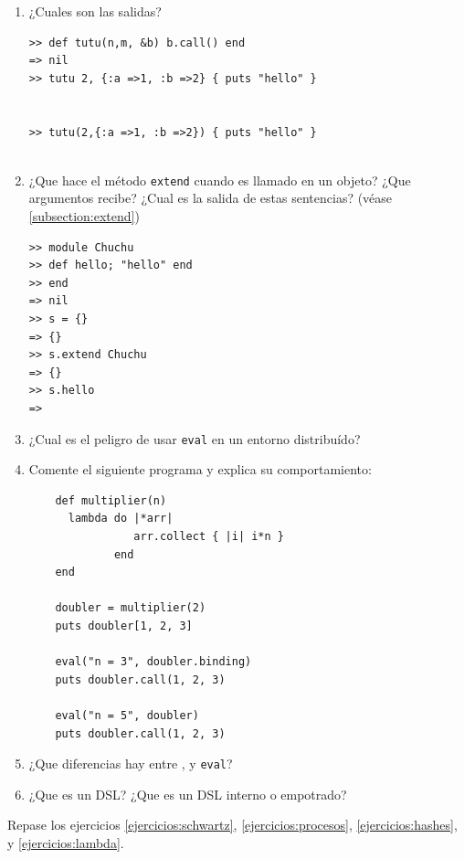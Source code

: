 \begin{enumerate}
\begin{verbatim}
   def initialize( block )
     @block = block
     @block.sub!(/^/,'lambda ') unless @block =~/^\s*(?:lambda|proc)/
     @func = eval "#{@block}"
   end


   def call(* args)
     __________(* args)
   end

   def arity
     @func.arity
   end

   def _____(limit)
     ______
   end

   def ____._____(s)
     ________(s)
   end
end
\end{verbatim}
\item ¿Cuales son las salidas?
\begin{verbatim}
>> def tutu(n,m, &b) b.call() end
=> nil
>> tutu 2, {:a =>1, :b =>2} { puts "hello" }


>> tutu(2,{:a =>1, :b =>2}) { puts "hello" }


\end{verbatim}
\item  ¿Que hace el método \verb|extend| cuando es llamado en un objeto?
¿Que argumentos recibe? ¿Cual es la salida de estas sentencias? (véase \ref{subsection:extend})
\begin{verbatim}
>> module Chuchu
>> def hello; "hello" end
>> end
=> nil
>> s = {}
=> {}
>> s.extend Chuchu
=> {}
>> s.hello
=> 
\end{verbatim}
\item ¿Cual es el peligro de usar \verb|eval| en un entorno distribuído?
\item
Comente el siguiente programa y explica su comportamiento:
\begin{verbatim}
    def multiplier(n)
      lambda do |*arr| 
                arr.collect { |i| i*n } 
             end
    end
    
    doubler = multiplier(2)
    puts doubler[1, 2, 3]
    
    eval("n = 3", doubler.binding)
    puts doubler.call(1, 2, 3)
    
    eval("n = 5", doubler)
    puts doubler.call(1, 2, 3)
\end{verbatim}
\item ¿Que diferencias hay entre ,  y \verb|eval|?
\item ¿Que es un DSL? ¿Que es un DSL interno o empotrado?

\end{enumerate}
Repase los ejercicios
\ref{ejercicios:schwartz},
\ref{ejercicios:procesos},
\ref{ejercicios:hashes},
y
\ref{ejercicios:lambda}.

